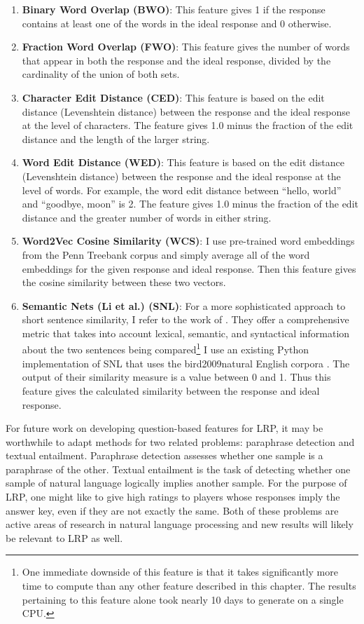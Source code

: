 \begin{enumerate}
\item \textbf{Binary Word Overlap (BWO)}: This feature gives 1 if the response contains at least one of the words in the ideal response and 0 otherwise.
\item \textbf{Fraction Word Overlap (FWO)}: This feature gives the number of words that appear in both the response and the ideal response, divided by the cardinality of the union of both sets.
\item \textbf{Character Edit Distance (CED)}: This feature is based on the edit distance (Levenshtein distance) between the response and the ideal response at the level of characters. The feature gives 1.0 minus the fraction of the edit distance and the length of the larger string.
\item \textbf{Word Edit Distance (WED)}:  This feature is based on the edit distance (Levenshtein distance) between the response and the ideal response at the level of words. For example, the word edit distance between ``hello, world'' and ``goodbye, moon'' is 2. The feature gives 1.0 minus the fraction of the edit distance and the greater number of words in either string.
\item \textbf{Word2Vec Cosine Similarity (WCS)}: I use pre-trained word embeddings from the Penn Treebank corpus and simply average all of the word embeddings for the given response and ideal response. Then this feature gives the cosine similarity between these two vectors.
\item \textbf{Semantic Nets (Li et al.) (SNL)}: For a more sophisticated approach to short sentence similarity, I refer to the work of \citet{li2006sentence}. They offer a comprehensive metric that takes into account lexical, semantic, and syntactical information about the two sentences being compared\footnote{One immediate downside of this feature is that it takes significantly more time to compute than any other feature described in this chapter. The results pertaining to this feature alone took nearly 10 days to generate on a single CPU.} I use an existing Python implementation of SNL that uses the bird2009natural English corpora  \citep{bird2009natural}. The output of their similarity measure is a value between 0 and 1. Thus this feature gives the calculated similarity between the response and ideal response.
\end{enumerate}

For future work on developing question-based features for LRP, it may be worthwhile to adapt methods for two related problems: paraphrase detection and textual entailment. Paraphrase detection assesses whether one sample is a paraphrase of the other. Textual entailment is the task of detecting whether one sample of natural language logically implies another sample. For the purpose of LRP, one might like to give high ratings to players whose responses imply the answer key, even if they are not exactly the same. Both of these problems are active areas of research in natural language processing and new results will likely be relevant to LRP as well.

